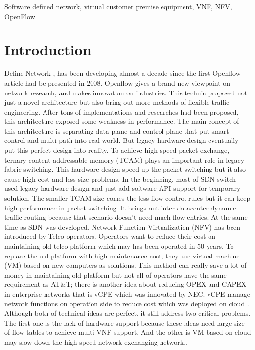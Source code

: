 \documentclass[journal]{IEEEtran}
\begin{document}
\begin{IEEEkeywords}
Software defined network, virtual customer premise equipment, VNF, NFV, OpenFlow
\end{IEEEkeywords}

\IEEEpeerreviewmaketitle{}


\section{Introduction}
 Define Network \cite{sdn-new-norm}, \cite{sdn-comprehensive} has been developing almost a decade since the first Openflow article had be presented in 2008\cite{openflow-campus-network}. Openflow\cite{sp:openflow13} gives a brand new viewpoint on network research, and makes innovation on industries. This technic proposed not just a novel architecture but also bring out more methods of flexible traffic engineering. After tons of implementations and researches had been proposed, this architecture exposed some weakness in performance. The main concept of this architecture is separating data plane and control plane that put smart control and multi-path into real world. But legacy hardware design eventually put this perfect design into reality. To achieve high speed packet exchange, ternary content-addressable memory (TCAM) plays an important role in legacy fabric switching. This hardware design speed up the packet switching but it also cause high cost and less size problems.
In the beginning, most of SDN switch used legacy hardware design and just add software API support for temporary solution. The smaller TCAM size comes the less flow control rules but it can keep high performance in packet switching. It brings out inter-datacenter dynamic traffic routing because that scenario doesn’t need much flow entries.
At the same time as SDN was developed, Network Function Virtualization (NFV) \cite{nfvwp}\cite{nfv-survey}\cite{laptop-sdn} has been introduced by Telco operators. Operators want to reduce their cost on maintaining old telco platform which may has been operated in 50 years. To replace the old platform with high maintenance cost, they use virtual machine (VM) based on new computers as solutions. This method can really save a lot of money in maintaining old platform but not all of operators have the same requirement as AT\&T; there is another idea about reducing OPEX and CAPEX in enterprise networks that is vCPE which was innovated by NEC\cite{nec-vcpe}. vCPE manage network functions on operation side to reduce cost which was deployed on cloud \cite{cloud4nfv}. Although both of technical ideas are perfect, it still address two critical problems. The first one is the lack of hardware support because these ideas need large size of flow tables to achieve multi VNF support. And the other is VM based on cloud may slow down the high speed network exchanging network\cite{nfv-placemet},\cite{nfv-placement-model}.
\end{document}
